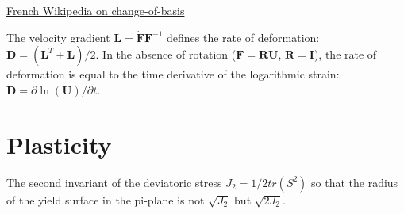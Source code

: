 \documentclass[letterpaper,12pt,oneside]{report}
\begin{document}
\href{https://fr.wikipedia.org/wiki/Matrice_de_passage}{French Wikipedia on change-of-basis}


The velocity gradient $\bm{L} = \dot{\bm{F}}\bm{F}^{-1}$ defines the rate of deformation: $\bm{D} = (\bm{L}^T + \bm{L})/2$.
In the absence of rotation ($\bm{F} = \bm{RU}$, $\bm{R} = \bm{I}$), the rate of deformation  is equal to the time derivative of the logarithmic strain: $\bm{D} = \partial \ln(\bm{U})/\partial t$.


\chapter{Plasticity}

The second invariant of the deviatoric stress $J_2 = 1/2 tr(S^2)$ so that the radius of the yield surface in the pi-plane is not $\sqrt{J_2}$ but $\sqrt{2J_2}$.
\end{document}
